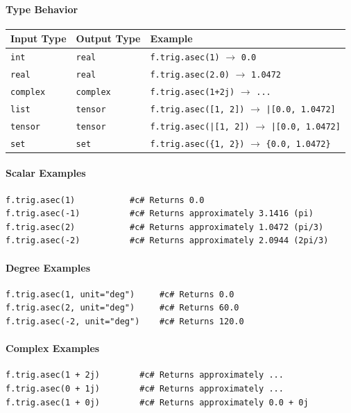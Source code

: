 \paragraph{Type Behavior}
\begin{center}
\begin{tabular}{lll}
\textbf{Input Type} & \textbf{Output Type} & \textbf{Example} \\ \hline
\texttt{int} & \texttt{real} & \texttt{f.trig.asec(1)} $\to$ \texttt{0.0} \\
\texttt{real} & \texttt{real} & \texttt{f.trig.asec(2.0)} $\to$ \texttt{1.0472} \\
\texttt{complex} & \texttt{complex} & \texttt{f.trig.asec(1+2j)} $\to$ \texttt{...} \\
\texttt{list} & \texttt{tensor} & \texttt{f.trig.asec([1, 2])} $\to$ \texttt{|[0.0, 1.0472]} \\
\texttt{tensor} & \texttt{tensor} & \texttt{f.trig.asec(|[1, 2])} $\to$ \texttt{|[0.0, 1.0472]} \\
\texttt{set} & \texttt{set} & \texttt{f.trig.asec(\{1, 2\})} $\to$ \texttt{\{0.0, 1.0472\}} \\
\end{tabular}
\end{center}

\paragraph{Scalar Examples}
\begin{verbatim}
f.trig.asec(1)           #c# Returns 0.0
f.trig.asec(-1)          #c# Returns approximately 3.1416 (pi)
f.trig.asec(2)           #c# Returns approximately 1.0472 (pi/3)
f.trig.asec(-2)          #c# Returns approximately 2.0944 (2pi/3)
\end{verbatim}

\paragraph{Degree Examples}
\begin{verbatim}
f.trig.asec(1, unit="deg")     #c# Returns 0.0
f.trig.asec(2, unit="deg")     #c# Returns 60.0
f.trig.asec(-2, unit="deg")    #c# Returns 120.0
\end{verbatim}

\paragraph{Complex Examples}
\begin{verbatim}
f.trig.asec(1 + 2j)        #c# Returns approximately ...
f.trig.asec(0 + 1j)        #c# Returns approximately ...
f.trig.asec(1 + 0j)        #c# Returns approximately 0.0 + 0j
\end{verbatim}

